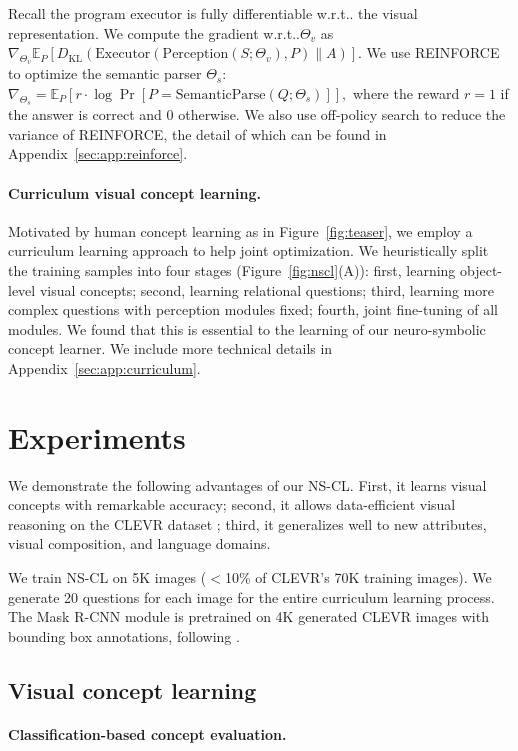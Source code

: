 \documentclass{article} %
\makeatletter
\newcommand{\E}{\mathbb{E}}
\newcommand{\KL}{D_{\mathrm{KL}}}
\newcommand{\fig}[1]{Figure~\ref{#1}}
\DeclareRobustCommand\onedot{\futurelet\@let@token\@onedot}
\def\@onedot{\ifx\@let@token.\else.\null\fi\xspace}
\def\wrt{w.r.t\onedot} \def\dof{d.o.f\onedot}
\newcommand{\modelfull}{neuro-symbolic concept learner\xspace}
\newcommand{\model}{NS-CL\xspace}
\newcommand{\myparagraph}[1]{\vspace{-3pt}\paragraph{#1}}
\makeatother
\begin{document}
Recall the program executor is fully differentiable \wrt the visual representation. We compute the gradient \wrt $\Theta_v$ as
$ \nabla_{\Theta_v} \E_{P}[\KL(\mathrm{Executor}(\mathrm{Perception}({S}; \Theta_v), P) \| A)]$. We use REINFORCE~\citep{Williams1992Simple} to optimize  the semantic parser $\Theta_s$:
$\nabla_{\Theta_s} = \E_{P}[ r \cdot \log \Pr[P = \mathrm{SemanticParse}(Q; {\Theta_s})]], $
where the reward $r=1$ if the answer is correct and 0 otherwise. We also use off-policy search to reduce the variance of REINFORCE, the detail of which can be found in Appendix~\ref{sec:app:reinforce}.

\myparagraph{Curriculum visual concept learning.}
\label{subsec:curriculum}
Motivated by human concept learning as in \fig{fig:teaser}, we employ a curriculum learning approach to help joint optimization. We heuristically split the training samples into four stages (\fig{fig:nscl}(A)): first, learning object-level visual concepts; second, learning relational questions; third, learning more complex questions with perception modules fixed; fourth, joint fine-tuning of all modules. We found that this is essential to the learning of our \modelfull.
We include more technical details in Appendix~\ref{sec:app:curriculum}.
%
\section{Experiments}

We demonstrate the following advantages of our \model. First, it learns visual concepts with remarkable accuracy; second, it allows data-efficient visual reasoning on the CLEVR dataset \citep{Johnson2017CLEVR}; third, it generalizes well to new attributes, visual composition, and language domains.

We train \model on 5K images ($<$10\% of CLEVR's 70K training images). We generate 20 questions for each image for the entire curriculum learning process. The Mask R-CNN module is pretrained on 4K generated CLEVR images with bounding box annotations, following \citet{kexin}.

\subsection{Visual concept learning}

\paragraph{Classification-based concept evaluation.}
\end{document}
